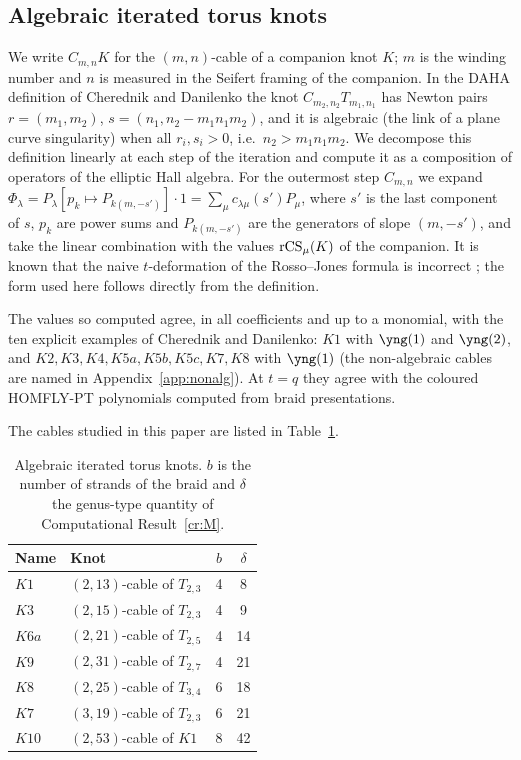 \subsection{Algebraic iterated torus knots}
We write $C_{m,n}K$ for the $(m,n)$-cable of a companion knot $K$; $m$ is the winding number and $n$ is measured in the Seifert framing of the companion.
In the DAHA definition of Cherednik and Danilenko \cite{Cherednik14,Cherednik15} the knot $C_{m_2,n_2}T_{m_1,n_1}$ has Newton pairs $r=(m_1,m_2)$, $s=(n_1,n_2-m_1n_1m_2)$,
and it is algebraic (the link of a plane curve singularity) when all $r_i,s_i>0$, i.e.\ $n_2>m_1n_1m_2$.
We decompose this definition linearly at each step of the iteration and compute it as a composition of operators of the elliptic Hall algebra.
For the outermost step $C_{m,n}$ we expand
$\Phi_\lambda=P_\lambda[p_k\mapsto P_{k(m,-s')}]\cdot1=\sum_\mu c_{\lambda\mu}(s')P_\mu$,
where $s'$ is the last component of $s$, $p_k$ are power sums and $P_{k(m,-s')}$ are the generators of slope $(m,-s')$,
and take the linear combination with the values $\mathrm{rCS}_\mu(K)$ of the companion.
It is known that the naive $t$-deformation of the Rosso--Jones formula \cite{Rosso93} is incorrect \cite{Danilenko14,Morozov18}; the form used here follows directly from the definition.
\begin{compresult}\label{cr:daha}
The values so computed agree, in all coefficients and up to a monomial, with the ten explicit examples of Cherednik and Danilenko:
$K1$ with $\yng(1)$ and $\yng(2)$, and $K2,K3,K4,K5a,K5b,K5c,K7,K8$ with $\yng(1)$ (the non-algebraic cables are named in Appendix~\ref{app:nonalg}).
At $t=q$ they agree with the coloured HOMFLY-PT polynomials computed from braid presentations.
\end{compresult}
The cables studied in this paper are listed in Table~\ref{tab:cables}.
\begin{table}[h]
\centering
\caption{Algebraic iterated torus knots. $b$ is the number of strands of the braid and $\delta$ the genus-type quantity of Computational Result~\ref{cr:M}.}\label{tab:cables}
\begin{tabular}{llcc}
\toprule
Name & Knot & $b$ & $\delta$ \\
\midrule
$K1$ & $(2,13)$-cable of $T_{2,3}$ & 4 & 8 \\
$K3$ & $(2,15)$-cable of $T_{2,3}$ & 4 & 9 \\
$K6a$ & $(2,21)$-cable of $T_{2,5}$ & 4 & 14 \\
$K9$ & $(2,31)$-cable of $T_{2,7}$ & 4 & 21 \\
$K8$ & $(2,25)$-cable of $T_{3,4}$ & 6 & 18 \\
$K7$ & $(3,19)$-cable of $T_{2,3}$ & 6 & 21 \\
$K10$ & $(2,53)$-cable of $K1$ & 8 & 42 \\
\bottomrule
\end{tabular}
\end{table}

